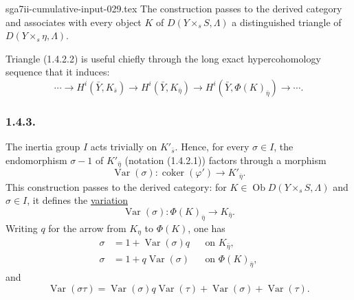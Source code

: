 \begin{filecontents*}{sga7ii-cumulative-input-029.tex}
The construction passes to the derived category and associates with
every object $K$ of $D(Y\times_sS,\Lambda)$ a distinguished triangle
of $D(Y\times_s\eta,\Lambda)$.

Triangle (1.4.2.2) is useful chiefly through the long exact
hypercohomology sequence that it induces:
\begin{equation*}
\cdots\longrightarrow H^i(\bar Y,K_{\bar s})
\longrightarrow H^i(\bar Y,K_{\bar\eta})
\longrightarrow H^i(\bar Y,\Phi(K)_{\bar\eta})
\longrightarrow\cdots.
\end{equation*}

\subsubsection*{1.4.3.}
The inertia group $I$ acts trivially on $K'_{\bar s}$.  Hence, for
every $\sigma\in I$, the endomorphism $\sigma-1$ of
$K'_{\bar\eta}$ (notation (1.4.2.1)) factors through a morphism
\begin{equation*}
\operatorname{Var}(\sigma):
\operatorname{coker}(\varphi')\longrightarrow K'_{\bar\eta}.
\end{equation*}
This construction passes to the derived category: for
$K\in\operatorname{Ob}D(Y\times_sS,\Lambda)$ and $\sigma\in I$, it
defines the \underline{variation}
\begin{equation}\tag{1.4.3.1}
\operatorname{Var}(\sigma):
\Phi(K)_{\bar\eta}\longrightarrow K_{\bar\eta}.
\end{equation}
Writing $q$ for the arrow from $K_\eta$ to $\Phi(K)$, one has
\begin{align}\tag{1.4.3.2}
\sigma&=1+\operatorname{Var}(\sigma)q
&&\text{on }K_{\bar\eta},\\
\tag{1.4.3.3}
\sigma&=1+q\operatorname{Var}(\sigma)
&&\text{on }\Phi(K)_{\bar\eta},
\end{align}
and
\begin{equation}\tag{1.4.3.4}
\operatorname{Var}(\sigma\tau)
=\operatorname{Var}(\sigma)q\operatorname{Var}(\tau)
 +\operatorname{Var}(\sigma)+\operatorname{Var}(\tau).
\end{equation}

\end{filecontents*}
